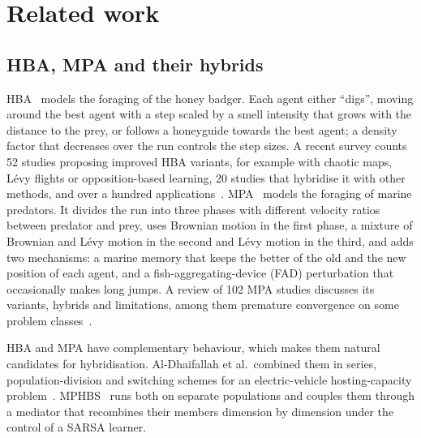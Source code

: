 \documentclass[preprint,12pt,authoryear]{elsarticle}
\theoremstyle{remark}
\begin{document}
\section{Related work}
\label{sec:related}

\subsection{HBA, MPA and their hybrids}
HBA~\citep{hashim2022hba} models the foraging of the honey badger. Each agent either ``digs'', moving around the best
agent with a step scaled by a smell intensity that grows with the distance to the prey, or follows a honeyguide towards
the best agent; a density factor that decreases over the run controls the step sizes. A recent survey counts 52 studies
proposing improved HBA variants, for example with chaotic maps, L\'evy flights or opposition-based learning, 20 studies
that hybridise it with other methods, and over a hundred applications~\citep{hassan2024hba}. MPA~\citep{faramarzi2020mpa}
models the foraging of marine predators. It divides the run into three phases with different velocity ratios between
predator and prey, uses Brownian motion in the first phase, a mixture of Brownian and L\'evy motion in the second and
L\'evy motion in the third, and adds two mechanisms: a marine memory that keeps the better of the old and the new
position of each agent, and a fish-aggregating-device (FAD) perturbation that occasionally makes long jumps. A review of
102 MPA studies discusses its variants, hybrids and limitations, among them premature convergence on some problem
classes~\citep{albetar2023mpa}.

HBA and MPA have complementary behaviour, which makes them natural candidates for hybridisation. Al-Dhaifallah et al.\
combined them in series, population-division and switching schemes for an electric-vehicle hosting-capacity
problem~\citep{aldhaifallah2024mpahba}. MPHBS~\citep{flores2026mphbs} runs both on separate populations and couples them
through a mediator that recombines their members dimension by dimension under the control of a SARSA learner.
\end{document}
